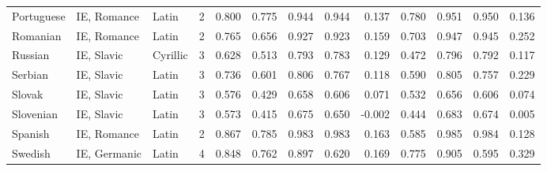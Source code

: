 \begin{tabular}{lllrrrrrrrrrr}
                     Portuguese &                     IE, Romance &      Latin &         2 &                       0.800 &                         0.775 &         0.944 &                  0.944 &            0.137 &                         0.780 &         0.951 &                  0.950 &            0.136 \\
                       Romanian &                     IE, Romance &      Latin &         2 &                       0.765 &                         0.656 &         0.927 &                  0.923 &            0.159 &                         0.703 &         0.947 &                  0.945 &            0.252 \\
                        Russian &                      IE, Slavic &   Cyrillic &         3 &                       0.628 &                         0.513 &         0.793 &                  0.783 &            0.129 &                         0.472 &         0.796 &                  0.792 &            0.117 \\
                        Serbian &                      IE, Slavic &      Latin &         3 &                       0.736 &                         0.601 &         0.806 &                  0.767 &            0.118 &                         0.590 &         0.805 &                  0.757 &            0.229 \\
                         Slovak &                      IE, Slavic &      Latin &         3 &                       0.576 &                         0.429 &         0.658 &                  0.606 &            0.071 &                         0.532 &         0.656 &                  0.606 &            0.074 \\
                      Slovenian &                      IE, Slavic &      Latin &         3 &                       0.573 &                         0.415 &         0.675 &                  0.650 &           -0.002 &                         0.444 &         0.683 &                  0.674 &            0.005 \\
                        Spanish &                     IE, Romance &      Latin &         2 &                       0.867 &                         0.785 &         0.983 &                  0.983 &            0.163 &                         0.585 &         0.985 &                  0.984 &            0.128 \\
                        Swedish &                    IE, Germanic &      Latin &         4 &                       0.848 &                         0.762 &         0.897 &                  0.620 &            0.169 &                         0.775 &         0.905 &                  0.595 &            0.329 \\

\end{tabular}
